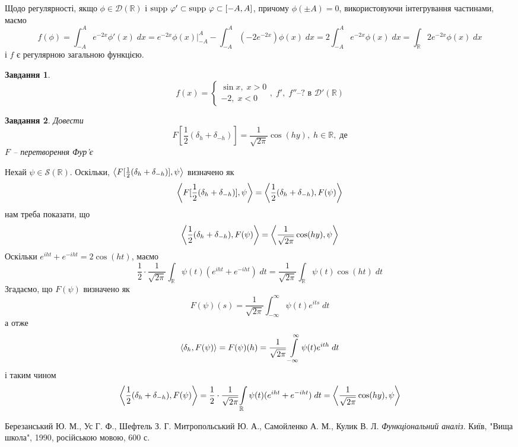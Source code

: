 \documentclass[10pt]{article}
\newtheorem{prob}{Завдання}
\newcommand{\dt}{\;dt}
\newcommand{\dx}{\;dx}
\begin{document}
Щодо регулярності, якщо $\phi\in\mathcal{D}(\mathbb{R})$ і $\mbox{supp }\varphi'\subset\mbox{supp }\varphi\subset[-A,A]$, причому $\phi(\pm A)=0$, використовуючи
інтегрування частинами, маємо
\[f(\phi)=\int_{-A}^Ae^{-2x}\phi'(x)\dx=e^{-2x}\phi(x)\bigg|_{-A}^A-\int_{-A}^A(-2e^{-2x})\phi(x)\dx=2\int_{-A}^Ae^{-2x}\phi(x)\dx=
\int_\mathbb{R}2e^{-2x}\phi(x)\dx\]
і $f$ є регулярною загальною функцією.
\begin{prob}
	\[f(x)=\left\{\begin{array}{ll}\sin x,\;x>0\\-2,\;x<0\end{array}\right.,\;\mbox{$f',\;f''$--?{ в }$\mathcal{D}'(\mathbb{R})$}\]
\end{prob}
\begin{prob}
	Довести
	\[F[\frac{1}{2}(\delta_h+\delta_{-h})]=\frac{1}{\sqrt{2\pi}}\cos(hy),\;h\in\mathbb{R},\;\mbox{де}\]
	$F$ -- перетворення Фур’є
\end{prob}
Нехай $\psi\in\mathcal{S}(\mathbb{R})$. Оскільки, $\left<F[\frac{1}{2}(\delta_h+\delta_{-h})],\psi\right>$ визначено як
\[\left<F[\frac{1}{2}(\delta_h+\delta_{-h})],\psi\right>=\left<\frac{1}{2}(\delta_h+\delta_{-h}),F(\psi)\right>\]
нам треба показати, що
\[\left<\frac{1}{2}(\delta_h+\delta_{-h}),F(\psi)\right>=\left<\frac{1}{\sqrt{2\pi}}\cos(hy),\psi\right>\]
Оскільки $e^{iht}+e^{-iht}=2\cos(ht)$, маємо
\[\frac{1}{2}\cdot\frac{1}{\sqrt{2\pi}}{\int_{\mathbb{R}}\psi(t)(e^{iht}+e^{-iht})\dt}=\frac{1}{\sqrt{2\pi}}\int_{\mathbb{R}}\psi(t)
\cos(ht)\dt\]
Згадаємо, що $F(\psi)$ визначено як
\[F(\psi)(s)=\frac{1}{\sqrt{2\pi}}\int_{-\infty}^\infty \psi(t)e^{its}\dt\]
а отже
\[\myabra{\delta_h,F(\psi)}=F(\psi)(h)=\frac{1}{\sqrt{2\pi}}\int_{-\infty}^\infty \psi(t)e^{ith}\dt\]
і таким чином
\[\myabra{\frac{1}{2}(\delta_h+\delta_{-h}),F(\psi)}=\frac{1}{2}\cdot\frac{1}{\sqrt{2\pi}}{\int_{\mathbb{R}}\psi(t)(e^{iht}+e^{-iht})\dt
}=
\myabra{\frac{1}{\sqrt{2\pi}}\cos(hy),\psi}\]
\begin{thebibliography}{9}
Березанський Ю. М., Ус Г. Ф., Шефтель З. Г.
Митропольський Ю. А., Самойленко А. М., Кулик В. Л.
\emph{Функціональний аналіз}.
Київ, "Вища школа"{}, 1990, російською мовою, 600 с.
\end{thebibliography}
\end{document}
